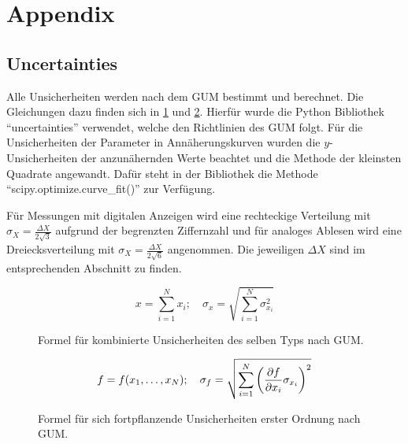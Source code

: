 \newpage
\appendix
\section{Appendix}\label{sec:appendix}

\subsection{Uncertainties}\label{sec:uncertainties}

Alle Unsicherheiten werden nach dem GUM bestimmt und berechnet.
Die Gleichungen dazu finden sich in \ref{fig:GUM_combine} und \ref{fig:GUM_formula}.
Hierfür wurde die Python Bibliothek \enquote{uncertainties} verwendet, welche den Richtlinien des GUM folgt.
Für die Unsicherheiten der Parameter in Annäherungskurven wurden die $y$-Unsicherheiten der anzunähernden Werte beachtet und die Methode der kleinsten Quadrate angewandt.
Dafür steht in der Bibliothek die Methode \enquote{scipy.optimize.curve\_fit()} zur Verfügung.

Für Messungen mit digitalen Anzeigen wird eine rechteckige Verteilung mit $\sigma_X = \frac{\Delta X}{2\sqrt{3}}$ aufgrund der begrenzten Ziffernzahl und für analoges Ablesen wird eine Dreiecksverteilung mit $\sigma_X = \frac{\Delta X}{2\sqrt{6}}$ angenommen.
Die jeweiligen $\Delta X$ sind im entsprechenden Abschnitt zu finden.

\begin{figure}[ht]
	\begin{equation*}
	x = \sum_{i=1}^{N} x_i
	;\quad
	\sigma_x = \sqrt{\sum_{i = 1}^{N} \sigma_{x_i}^2}
	\end{equation*}
	\caption{Formel für kombinierte Unsicherheiten des selben Typs nach GUM.}
	\label{fig:GUM_combine}
\end{figure}

\begin{figure}[ht]
	\begin{align*}
	f = f(x_1, \dots , x_N)
	;\quad
	\sigma_f = \sqrt{\sum_{i = 1}^{N}\left(\pdv{f}{x_i} \sigma_{x_i}\right) ^2}
	\end{align*}
	\caption{Formel für sich fortpflanzende Unsicherheiten erster Ordnung nach GUM.}
	\label{fig:GUM_formula}
\end{figure}


